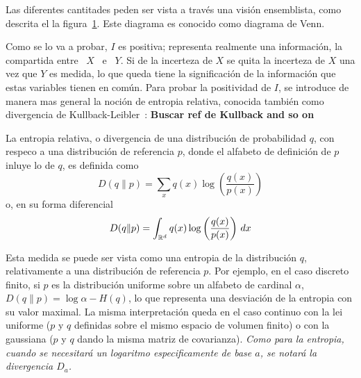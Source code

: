 Las diferentes cantitades  peden ser vista a trav\'es  una visi\'on ensemblista,
como  descrita el la  figura~\ref{fig:SZ:Venn}. Este  diagrama es  conocido como
diagrama de Venn.
%
\begin{figure}[h!]
\begin{center}     \end{center}
%
\label{fig:SZ:Venn}
\end{figure}

Como se lo va a probar, $I$ es positiva; representa realmente una informaci\'on,
la compartida  entre \ $X$  \ e  \ $Y$. Si  de la incerteza  de $X$ se  quita la
incerteza  de  $X$   una  vez  que  $Y$  es  medida,  lo   que  queda  tiene  la
significaci\'on de la informaci\'on que  estas variables tienen en com\'un. Para
probar la positividad de $I$, se  introduce de manera mas general la noci\'on de
entropia     relativa,     conocida     tambi\'en    como     divergencia     de
Kullback-Leibler~\cite{CovTho06, Rio07, Kul}:
%
{\bf\color{red} Buscar ref de Kullback and so on}
%
\begin{definicion}\label{def:SZ:entropiarelativa}
  La entropia relativa, o divergencia de una distribuci\'on de probabilidad $q$,
  con  respeco a  una distribuci\'on  de referencia  $p$, donde  el  alfabeto de
  definici\'on de $p$ inluye lo de $q$, es definida como
  \[
  D(q\|p) = \sum_x q(x) \log \left( \frac{q(x)}{p(x)} \right)
  \]
 o, en su forma diferencial
 \[
 D(q\|p) = \int_{\mathbb{R}^d} q(x) \log \left( \frac{q(x)}{p(x)} \right) \, dx
 \]
\end{definicion}
%
Esta  medida se  puede ser  vista como  una entropia  de la  distribuci\'on $q$,
relativamente a  una distribuci\'on de referencia  $p$. Por ejemplo,  en el caso
discreto  finito, si  $p$ es  la distribuci\'on  uniforme sobre  un  alfabeto de
cardinal  $\alpha$,  $D(q\|p) =  \log  \alpha -  H(q)$,  lo  que representa  una
desviaci\'on  de la  entropia con  su valor  maximal. La  misma interpretaci\'on
queda en  el caso continuo  con la  lei uniforme ($p$  y $q$ definidas  sobre el
mismo espacio de  volumen finito) o con  la gaussiana ($p$ y $q$  dando la misma
matriz de  covarianza). {\it  Como para la  entropia, cuando se  necesitar\'a un
  logaritmo especificamente de base $a$, se notar\'a la divergencia $D_a$.}

